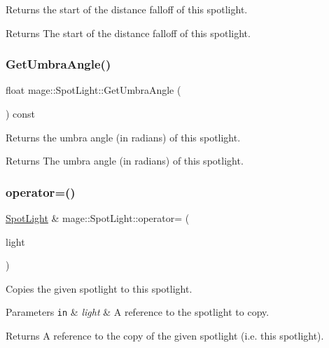 Returns the start of the distance falloff of this spotlight.

\begin{DoxyReturn}{Returns}
The start of the distance falloff of this spotlight. 
\end{DoxyReturn}
\hypertarget{classmage_1_1_spot_light_ab4d85fd032083e82f711596a8b075d02}{}\label{classmage_1_1_spot_light_ab4d85fd032083e82f711596a8b075d02} 
\subsubsection{\texorpdfstring{Get\+Umbra\+Angle()}{GetUmbraAngle()}}
{\footnotesize\ttfamily float mage\+::\+Spot\+Light\+::\+Get\+Umbra\+Angle (\begin{DoxyParamCaption}{ }\end{DoxyParamCaption}) const}

Returns the umbra angle (in radians) of this spotlight.

\begin{DoxyReturn}{Returns}
The umbra angle (in radians) of this spotlight. 
\end{DoxyReturn}
\hypertarget{classmage_1_1_spot_light_a04a23d643186a58fb3a03d0a73a63e39}{}\label{classmage_1_1_spot_light_a04a23d643186a58fb3a03d0a73a63e39} 
\subsubsection{\texorpdfstring{operator=()}{operator=()}\hspace{0.1cm}{\footnotesize\ttfamily [1/2]}}
{\footnotesize\ttfamily \hyperlink{classmage_1_1_spot_light}{Spot\+Light} \& mage\+::\+Spot\+Light\+::operator= (\begin{DoxyParamCaption}\item[{const \hyperlink{classmage_1_1_spot_light}{Spot\+Light} \&}]{light }\end{DoxyParamCaption})\hspace{0.3cm}{\ttfamily [default]}}

Copies the given spotlight to this spotlight.


\begin{DoxyParams}[1]{Parameters}
\mbox{\tt in}  & {\em light} & A reference to the spotlight to copy. \\
\hline
\end{DoxyParams}
\begin{DoxyReturn}{Returns}
A reference to the copy of the given spotlight (i.\+e. this spotlight). 
\end{DoxyReturn}
\hypertarget{classmage_1_1_spot_light_ab79e4bf1c488c1a753f434a4d84567e5}{}\label{classmage_1_1_spot_light_ab79e4bf1c488c1a753f434a4d84567e5} 
